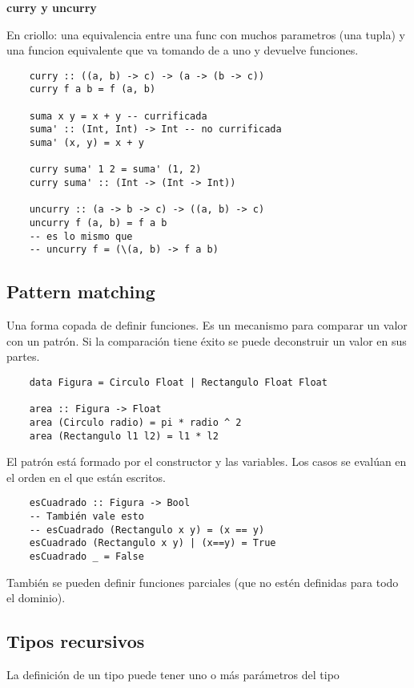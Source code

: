 \documentclass{report}
\theoremstyle{definition} %
\begin{document}
\textbf{curry y uncurry}

En criollo: una equivalencia entre una func con muchos parametros (una tupla) y
una funcion equivalente que va tomando de a uno y devuelve funciones.

\begin{verbatim}
    curry :: ((a, b) -> c) -> (a -> (b -> c))
    curry f a b = f (a, b)

    suma x y = x + y -- currificada
    suma' :: (Int, Int) -> Int -- no currificada
    suma' (x, y) = x + y

    curry suma' 1 2 = suma' (1, 2)
    curry suma' :: (Int -> (Int -> Int))

    uncurry :: (a -> b -> c) -> ((a, b) -> c)
    uncurry f (a, b) = f a b
    -- es lo mismo que
    -- uncurry f = (\(a, b) -> f a b)
\end{verbatim}

\subsection{Pattern matching}

Una forma copada de definir funciones. Es un mecanismo para comparar un valor
con un patrón. Si la comparación tiene éxito se puede deconstruir un valor en
sus partes.

\begin{verbatim}
    data Figura = Circulo Float | Rectangulo Float Float

    area :: Figura -> Float
    area (Circulo radio) = pi * radio ^ 2
    area (Rectangulo l1 l2) = l1 * l2
\end{verbatim}

El patrón está formado por el constructor y las variables. Los casos se evalúan
en el orden en el que están escritos.

\begin{verbatim}
    esCuadrado :: Figura -> Bool
    -- También vale esto
    -- esCuadrado (Rectangulo x y) = (x == y)
    esCuadrado (Rectangulo x y) | (x==y) = True
    esCuadrado _ = False
\end{verbatim}

También se pueden definir funciones parciales (que no estén definidas para todo
el dominio).

\subsection{Tipos recursivos}
La definición de un tipo puede tener uno o más parámetros del tipo
\end{document}
